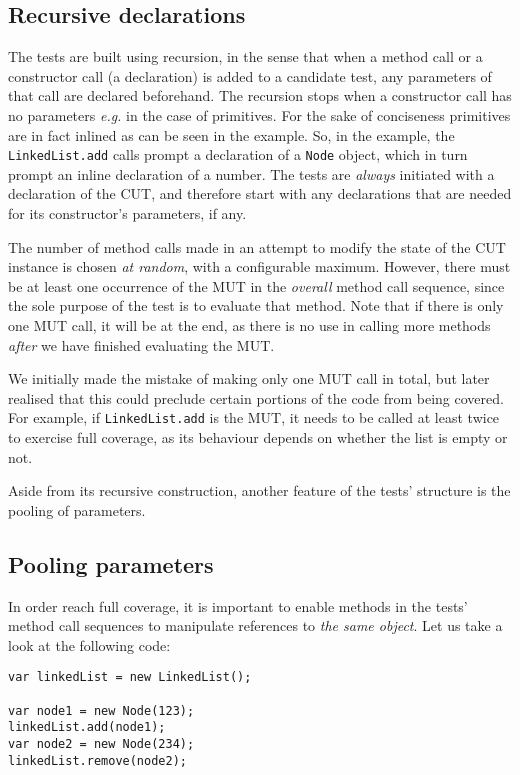 \subsection{Recursive declarations}

The tests are built using recursion, in the sense that when a method call or a constructor call (a declaration) is added to a candidate test, any parameters of that call are declared beforehand. The recursion stops when a constructor call has no parameters \emph{e.g.} in the case of primitives. For the sake of conciseness primitives are in fact inlined as can be seen in the example. So, in the example, the \texttt{LinkedList.add} calls prompt a declaration of a \texttt{Node} object, which in turn prompt an inline declaration of a number.
The tests are \emph{always} initiated with a declaration of the CUT, and therefore start with any declarations that are needed for its constructor's parameters, if any.

The number of method calls made in an attempt to modify the state of the CUT instance is chosen \emph{at random}, with a configurable maximum. However, there must be at least one occurrence of the MUT in the \emph{overall} method call sequence, since the sole purpose of the test is to evaluate that method. Note that if there is only one MUT call, it will be at the end, as there is no use in calling more methods \emph{after} we have finished evaluating the MUT.

We initially made the mistake of making only one MUT call in total, but later realised that this could preclude certain portions of the code from being covered. For example, if \texttt{LinkedList.add} is the MUT, it needs to be called at least twice to exercise full coverage, as its behaviour depends on whether the list is empty or not.

Aside from its recursive construction, another feature of the tests' structure is the pooling of parameters.

\subsection{Pooling parameters}
In order reach full coverage, it is important to enable methods in the tests' method call sequences to manipulate references to \emph{the same object}. Let us take a look at the following code:

\begin{lstlisting}
var linkedList = new LinkedList();

var node1 = new Node(123);
linkedList.add(node1);
var node2 = new Node(234);
linkedList.remove(node2);
\end{lstlisting}

